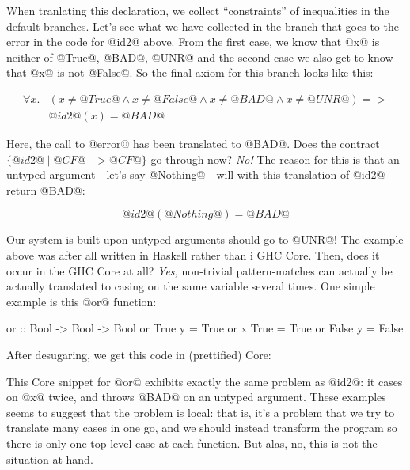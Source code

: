 When tranlating this declaration, we collect ``constraints'' of
inequalities in the default branches. Let's see what we have collected
in the branch that goes to the error in the code for @id2@ above.
From the first case, we know that @x@ is neither of @True@, @BAD@,
@UNR@ and the second case we also get to know that @x@ is not
@False@. So the final axiom for this branch looks like this:

\[\begin{array}{rl}
\forall x . &
    (x \neq @True@ \land
     x \neq @False@ \land
     x \neq @BAD@ \land
     x \neq @UNR@) =>  \\ & @id2@(x) = @BAD@
\end{array}\]

Here, the call to @error@ has been translated to @BAD@. Does the
contract $\{ @id2@ \mid @CF@ -> @CF@ \}$ go through now? \emph{No!}
The reason for this is that an untyped argument - let's say @Nothing@ -
will with this translation of @id2@ return @BAD@:

$$@id2@(@Nothing@) = @BAD@$$

Our system is built upon untyped arguments should go to @UNR@!  The
example above was after all written in Haskell rather than i GHC Core.
Then, does it occur in the GHC Core at all? \emph{Yes,} non-trivial
pattern-matches can actually be actually translated to casing on the
same variable several times. One simple example is this @or@ function:

\begin{code}
    or :: Bool -> Bool -> Bool
    or True  y    = True
    or x     True = True
    or False y    = False
\end{code}

After desugaring, we get this code in (prettified) Core:

\begin{code}
or :: Bool -> Bool -> Ok
or = \ (x :: Bool) (y :: Bool) ->
    case x of {
        True -> True
        _ -> case y of {
            True -> True
            _ -> case x of {
                False -> False
                _ -> patError "function or"
\end{code}

This Core snippet for @or@ exhibits exactly the same problem as @id2@:
it cases on @x@ twice, and throws @BAD@ on an untyped argument.  These
examples seems to suggest that the problem is local: that is, it's a
problem that we try to translate many cases in one go, and we should
instead transform the program so there is only one top level case at
each function. But alas, no, this is not the situation at
hand.

